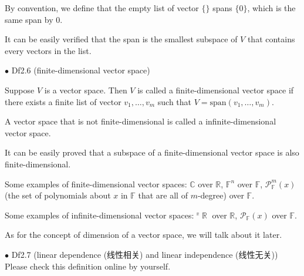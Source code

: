 \documentclass{article}
\begin{document}
\begin{Rmk}{}
    \begin{compactenum}
        \item By convention, \textcolor{Df}{we define that the empty list of vector $\{\}$ spans $\{0\}$, which is the same span by $0$.}
        \item It can be easily verified that \textcolor{Th}{the span is the smallest subspace of $V$ that contains every vectors in the list.}
    \end{compactenum}
\end{Rmk}

\begin{Df}{$\bullet$ Df2.6 (finite-dimensional vector space)}
    \begin{compactitem}
        \item Suppose $V$ is a vector space. Then $V$ is called a finite-dimensional vector space if there exists a finite list of vector $v_1, \dots, v_m$ such that $V = \text{span}(v_1, \dots, v_m)$.
        \item A vector space that is not finite-dimensional is called a infinite-dimensional vector space.
    \end{compactitem}
\end{Df}

\begin{Rmk}{}
    \begin{compactitem}
        \item \textcolor{Th}{It can be easily proved that a subspace of a finite-dimensional vector space is also finite-dimensional.}
        \item \textcolor{Th}{Some examples of finite-dimensional vector spaces: $\mathbb{C}$ over $\mathbb{R}$, $\mathbb{F}^n$ over $\mathbb{F}$, $\mathcal{P}_\mathbb{F}^m (x)$ } \textcolor{Df}{(the set of polynomials about $x$ in $\mathbb{F}$ that are all of $m$-degree)} \textcolor{Th}{over $\mathbb{F}$.}
        \item \textcolor{Th}{Some examples of infinite-dimensional vector spaces: $\overset{^\mathbb{R}}{}{\mathop{\mathbb{R}}}$ over $\mathbb{R}$, $\mathcal{P}_\mathbb{F}(x)$ over $\mathbb{F}$.}
        \item As for the concept of dimension of a vector space, we will talk about it later.
    \end{compactitem}
\end{Rmk}

\begin{Df}{$\bullet$ Df2.7 (linear dependence (线性相关) and linear independence (线性无关))}
    Please check this definition online by yourself.
\end{Df}
\end{document}
